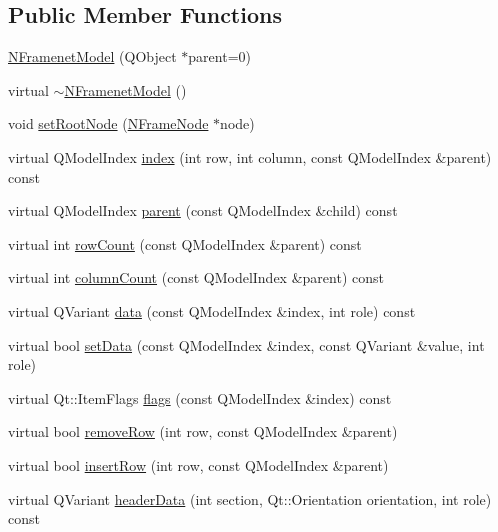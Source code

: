 \subsection*{Public Member Functions}
\begin{DoxyCompactItemize}
\item 
\hyperlink{class_n_framenet_model_a196741ac5dcfd845755af572f0869715}{NFramenetModel} (QObject $\ast$parent=0)
\item 
virtual \hyperlink{class_n_framenet_model_a1f77fac5113f412bea880c8751889450}{$\sim$NFramenetModel} ()
\item 
void \hyperlink{class_n_framenet_model_a7241bcb22067b5ef4d589610f2884ae2}{setRootNode} (\hyperlink{class_n_frame_node}{NFrameNode} $\ast$node)
\item 
virtual QModelIndex \hyperlink{class_n_framenet_model_a1f68211ea7db22e99aecc6471cdd7c98}{index} (int row, int column, const QModelIndex \&parent) const 
\item 
virtual QModelIndex \hyperlink{class_n_framenet_model_a4d97227ae131e3a9ad95bbc8e93107ad}{parent} (const QModelIndex \&child) const 
\item 
virtual int \hyperlink{class_n_framenet_model_abe8cef3ac67eb7d4b6864ed31e79ae3d}{rowCount} (const QModelIndex \&parent) const 
\item 
virtual int \hyperlink{class_n_framenet_model_a0c4d465a549745292980d2e9016611aa}{columnCount} (const QModelIndex \&parent) const 
\item 
virtual QVariant \hyperlink{class_n_framenet_model_af0369f07080b76af77f15273b08bd57e}{data} (const QModelIndex \&index, int role) const 
\item 
virtual bool \hyperlink{class_n_framenet_model_a3c2cbe1667ed3efd2410743831a431ae}{setData} (const QModelIndex \&index, const QVariant \&value, int role)
\item 
virtual Qt::ItemFlags \hyperlink{class_n_framenet_model_a740e819c63e461eb2e1a974178718974}{flags} (const QModelIndex \&index) const 
\item 
virtual bool \hyperlink{class_n_framenet_model_ad6336a9af3150860e1db4117c06dd46e}{removeRow} (int row, const QModelIndex \&parent)
\item 
virtual bool \hyperlink{class_n_framenet_model_a35f0185e97939304fe1213aa78755248}{insertRow} (int row, const QModelIndex \&parent)
\item 
virtual QVariant \hyperlink{class_n_framenet_model_ad585affade64c322c1467a84376b3bcd}{headerData} (int section, Qt::Orientation orientation, int role) const 

\end{DoxyCompactItemize}
